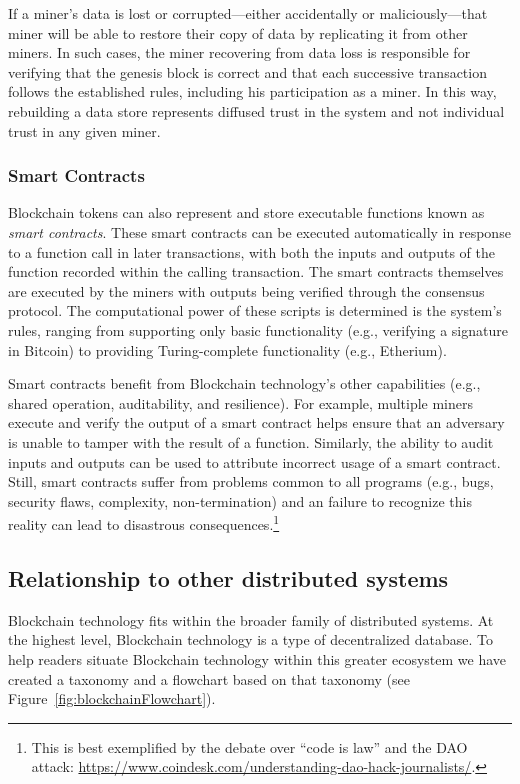 If a miner's data is lost or corrupted---either accidentally or maliciously---that miner will be able to restore their copy of data by replicating it from other miners.
In such cases, the miner recovering from data loss is responsible for verifying that the genesis block is correct and that each successive transaction follows the established rules, including his participation as a miner.
In this way, rebuilding a data store represents diffused trust in the system and not individual trust in any given miner.

\subsubsection{Smart Contracts}
Blockchain tokens can also represent and store executable functions known as \emph{smart contracts}.
These smart contracts can be executed automatically in response to a function call in later transactions, with both the inputs and outputs of the function recorded within the calling transaction.
The smart contracts themselves are executed by the miners with outputs being verified through the consensus protocol.
The computational power of these scripts is determined is the system's rules, ranging from supporting only basic functionality (e.g., verifying a signature in Bitcoin) to providing Turing-complete functionality (e.g., Etherium).

Smart contracts benefit from Blockchain technology's other capabilities (e.g., shared operation, auditability, and resilience).
For example, multiple miners execute and verify the output of a smart contract helps ensure that an adversary is unable to tamper with the result of a function.
Similarly, the ability to audit inputs and outputs can be used to attribute incorrect usage of a smart contract.
Still, smart contracts suffer from problems common to all programs (e.g., bugs, security flaws, complexity, non-termination) and an failure to recognize this reality can lead to disastrous consequences.\footnote{This is best exemplified by the debate over ``code is law'' and the DAO attack: \url{https://www.coindesk.com/understanding-dao-hack-journalists/}.}

\subsection{Relationship to other distributed systems}
Blockchain technology fits within the broader family of distributed systems.
At the highest level, Blockchain technology is a type of decentralized database.
To help readers situate Blockchain technology within this greater ecosystem we have created a taxonomy and a flowchart based on that taxonomy (see Figure~\ref{fig:blockchainFlowchart}).

